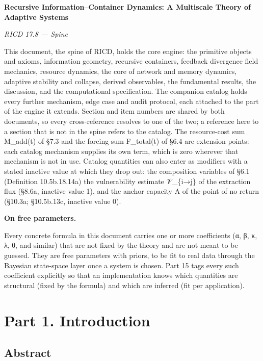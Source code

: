 \documentclass[
]{article}
\author{}
\date{}
\begin{document}
\textbf{Recursive Information--Container Dynamics: A Multiscale Theory
of Adaptive Systems}

\emph{RICD 17.8 --- Spine}

This document, the spine of RICD, holds the core engine: the primitive
objects and axioms, information geometry, recursive containers, feedback
divergence field mechanics, resource dynamics, the core of network and
memory dynamics, adaptive stability and collapse, derived observables,
the fundamental results, the discussion, and the computational
specification. The companion catalog holds every further mechanism, edge
case and audit protocol, each attached to the part of the engine it
extends. Section and item numbers are shared by both documents, so every
cross-reference resolves to one of the two; a reference here to a
section that is not in the spine refers to the catalog. The
resource-cost sum M\_add(t) of §7.3 and the forcing sum F\_total(t) of
§6.4 are extension points: each catalog mechanism supplies its own term,
which is zero wherever that mechanism is not in use. Catalog quantities
can also enter as modifiers with a stated inactive value at which they
drop out: the composition variables of §6.1 (Definition 10.5b.18.14a)
the vulnerability estimate 𝒱\_\{i→j\} of the extraction flux (§8.6a,
inactive value 1), and the anchor capacity A of the point of no return
(§10.3a; §10.5b.13c, inactive value 0).

\textbf{On free parameters.}

Every concrete formula in this document carries one or more coefficients
(α, β, κ, λ, θ, and similar) that are not fixed by the theory and are
not meant to be guessed. They are free parameters with priors, to be fit
to real data through the Bayesian state-space layer once a system is
chosen. Part 15 tags every such coefficient explicitly so that an
implementation knows which quantities are structural (fixed by the
formula) and which are inferred (fit per application).

\hypertarget{part-1.-introduction}{%
\section{Part 1. Introduction}\label{part-1.-introduction}}

\hypertarget{abstract}{%
\subsection{Abstract}\label{abstract}}
\end{document}
